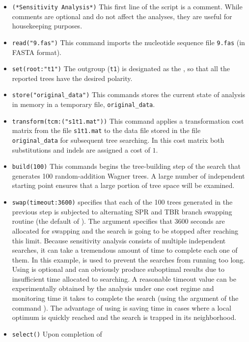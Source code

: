 \begin{itemize} 
\item \texttt{(*Sensitivity Analysis*)} This first line of the script 
is a comment. While comments are optional and do not affect the analyses, 
they are useful for housekeeping purposes.
\item \texttt{read("9.fas")} This command imports the nucleotide
sequence file \texttt{9.fas} (in FASTA format).  
\item \texttt{set(root:"t1")} The outgroup (\texttt{t1}) is designated
as the , so that all the reported trees have the
desired polarity.  
\item \texttt{store("original\_data")} This commands stores the current 
state of analysis in memory in a temporary file, \texttt{original\_data}.  
\item \texttt{transform(tcm:("s1t1.mat"))}
This command applies a transformation cost matrix from the file
\texttt{s1t1.mat} to the data file stored in the file
\texttt{original\_data} for subsequent tree searching. In this cost
matrix both substitutions and indels are assigned a cost of $ 1 $.
\item \texttt{build(100)} This commands begins the tree-building
step of the search that generates 100 random-addition Wagner trees.
A large number of independent starting point ensures that a large
portion of tree space will be examined.  
\item \texttt{swap(timeout:3600)}  specifies that 
each of the 100 trees generated
in the previous step is subjected to alternating SPR and TBR branch
swapping routine (the default of \poy). The argument 
specifies that 3600 seconds are allocated for swapping and the
search is going to be stopped after reaching this limit. Because
sensitivity analysis consists of multiple independent searches, it
can take a tremendous amount of time to complete each one of them.
In this example,  is used to prevent the
searches from running too long. Using  is
optional and can obviously produce suboptimal results due to
insufficient time allocated to searching. A reasonable timeout value
can be experimentally obtained by the analysis under one cost regime
and monitoring time it takes to complete the search (using the
argument  of the command ). The
advantage of using  is saving time in cases
where a local optimum is quickly reached and the search is trapped
in its neighborhood.  
\item \texttt{select()} Upon completion of

\end{itemize}
